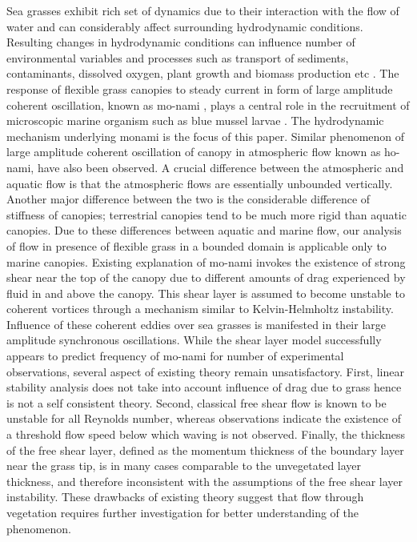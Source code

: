\documentclass[aps,prl,twocolumn,showpacs,superscriptaddress,groupedaddress,10pt]{revtex4-1}  %
\begin{document}
Sea grasses exhibit rich set of dynamics due to their interaction with the flow of water and can considerably affect surrounding hydrodynamic conditions.
Resulting changes in hydrodynamic conditions can influence number of environmental variables and processes such as 
transport of sediments, contaminants, dissolved oxygen, plant growth and biomass production etc \cite{Fonseca87,Nepf99}. 
The response of flexible grass canopies to steady current in form of large amplitude coherent oscillation, known as mo-nami \cite{AckermanOkubo93}, plays a central role
in the recruitment of microscopic marine organism such as blue mussel larvae \cite{Grizzle96}. The hydrodynamic mechanism underlying monami is the focus of this paper. 
\newline
Similar phenomenon of large amplitude coherent oscillation of canopy in atmospheric flow known as ho-nami\cite{Inoue56,Raupach96}, have also been observed.
A crucial difference between the atmospheric and aquatic flow is that the atmospheric flows are essentially unbounded vertically\cite{Vivoni98}. Another major
difference between the two is the considerable difference of stiffness of canopies; terrestrial canopies tend to be much more rigid than aquatic canopies\cite{Ghisal02}.
Due to these differences between aquatic and marine flow, our analysis of flow in presence of flexible grass in a bounded domain is applicable only to marine canopies. 
\newline   
Existing explanation of mo-nami invokes the existence of strong shear near the top of the canopy \cite{Ghisal02,Raupach96} due to
different amounts of drag experienced by fluid in and above the canopy. This shear layer is assumed to become unstable to coherent vortices through a mechanism similar to 
Kelvin-Helmholtz instability. Influence of these coherent eddies over sea grasses is manifested in their large amplitude synchronous oscillations.
\newline
While the shear layer model successfully appears to predict frequency of mo-nami for number of experimental observations, several aspect of existing theory remain unsatisfactory. 
First, linear stability analysis\cite{Raupach96} does not take into account influence of drag due to grass hence is not a self consistent theory. Second, classical free shear flow 
is known to be unstable for all Reynolds number\cite{drazin}, whereas observations\cite{Grizzle96} indicate the existence of a threshold flow speed below which waving is not observed. 
Finally, the thickness of the free shear layer, defined as the momentum thickness of the boundary layer near the grass tip, is in many cases comparable to the unvegetated layer thickness,
 and therefore inconsistent with the assumptions of the free shear layer instability. These drawbacks of existing theory suggest that flow through vegetation requires further investigation for better understanding of the phenomenon.
\end{document}
